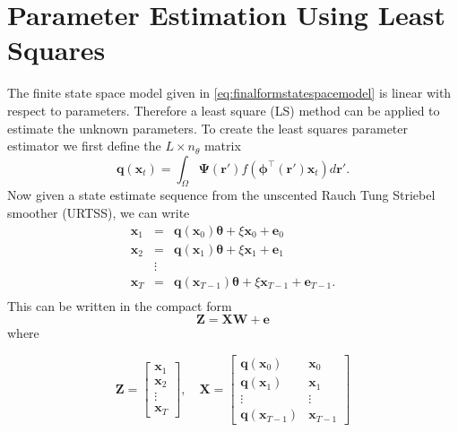 \documentclass[twocolumn,11pt,a4paper]{article}		%
\begin{document}
\section{Parameter Estimation Using Least Squares}\label{App:LeastSquaresAppendix} 
The finite state space model given in \ref{eq:finalformstatespacemodel} is linear with respect to parameters. Therefore a least square (LS) method can be applied to estimate the unknown parameters. To create the least squares parameter estimator we first define the $L \times n_{\theta}$ matrix
\begin{equation}
	\mathbf{q}(\mathbf{x}_t) = \int_\Omega \boldsymbol{\Psi}(\mathbf{r}') f(\boldsymbol{\phi}^{\top}(\mathbf{r}')\mathbf{x}_t) d\mathbf{r}'.
\end{equation}
Now given a state estimate sequence from the unscented Rauch Tung Striebel smoother (URTSS), we can write
\begin{eqnarray}
	\mathbf x_{1} &=& \mathbf{q}(\mathbf x_0) \boldsymbol{\theta}+\xi\mathbf x_0+\mathbf e_0 \nonumber \\
	\mathbf x_{2} &=& \mathbf{q}(\mathbf x_1) \boldsymbol{\theta}+\xi\mathbf x_1+\mathbf e_1 \nonumber \\
	&\vdots& \\
	\mathbf x_{T}&=&\mathbf{q}(\mathbf x_{T-1}) \boldsymbol{\theta}+\xi\mathbf x_{T-1}+\mathbf e_{T-1}. \nonumber \\
\end{eqnarray}
This can be written in the compact form
\begin{equation}
	\mathbf Z=\mathbf X \mathbf W+\mathbf{e} 
\end{equation}
where
\begin{small}
\begin{equation*}
	\mathbf Z=\left[
	\begin{array}{cccc}
		\mathbf x_{1}\\
		\mathbf x_{2}\\
		\vdots\\
		\mathbf x_{T}
	\end{array}
	\right],\quad \mathbf X=\left[
	\begin{array}{cccc}
		\mathbf q(\mathbf x_0)& \mathbf x_{0}\\
		\mathbf q(\mathbf x_1)& \mathbf x_{1}\\
		\vdots & \vdots\\
		\mathbf q(\mathbf x_{T-1})& \mathbf x_{T-1}
	\end{array}
	\right] 
\end{equation*}
\end{small}
\end{document}
